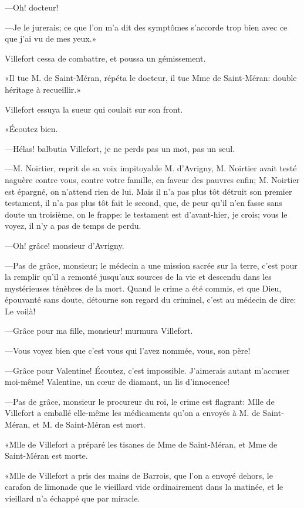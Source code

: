 —Oh! docteur! 

—Je le jurerais; ce que l'on m'a dit des symptômes s'accorde trop bien avec ce que j'ai vu de mes yeux.» 

Villefort cessa de combattre, et poussa un gémissement. 

«Il tue M. de Saint-Méran, répéta le docteur, il tue Mme de Saint-Méran: double héritage à recueillir.» 

Villefort essuya la sueur qui coulait sur son front. 

«Écoutez bien. 

—Hélas! balbutia Villefort, je ne perds pas un mot, pas un seul. 

—M. Noirtier, reprit de sa voix impitoyable M. d'Avrigny, M. Noirtier avait testé naguère contre vous, contre votre famille, en faveur des pauvres enfin; M. Noirtier est épargné, on n'attend rien de lui. Mais il n'a pas plus tôt détruit son premier testament, il n'a pas plus tôt fait le second, que, de peur qu'il n'en fasse sans doute un troisième, on le frappe: le testament est d'avant-hier, je crois; vous le voyez, il n'y a pas de temps de perdu. 

—Oh! grâce! monsieur d'Avrigny. 

—Pas de grâce, monsieur; le médecin a une mission sacrée sur la terre, c'est pour la remplir qu'il a remonté jusqu'aux sources de la vie et descendu dans les mystérieuses ténèbres de la mort. Quand le crime a été commis, et que Dieu, épouvanté sans doute, détourne son regard du criminel, c'est au médecin de dire: Le voilà! 

—Grâce pour ma fille, monsieur! murmura Villefort. 

—Vous voyez bien que c'est vous qui l'avez nommée, vous, son père! 

—Grâce pour Valentine! Écoutez, c'est impossible. J'aimerais autant m'accuser moi-même! Valentine, un cœur de diamant, un lis d'innocence! 

—Pas de grâce, monsieur le procureur du roi, le crime est flagrant: Mlle de Villefort a emballé elle-même les médicaments qu'on a envoyés à M. de Saint-Méran, et M. de Saint-Méran est mort. 

«Mlle de Villefort a préparé les tisanes de Mme de Saint-Méran, et Mme de Saint-Méran est morte. 

«Mlle de Villefort a pris des mains de Barrois, que l'on a envoyé dehors, le carafon de limonade que le vieillard vide ordinairement dans la matinée, et le vieillard n'a échappé que par miracle.  

